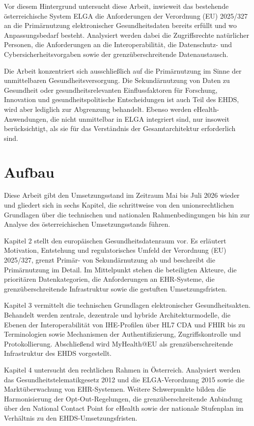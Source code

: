 Vor diesem Hintergrund untersucht diese Arbeit, inwieweit das bestehende österreichische System ELGA die Anforderungen der Verordnung (EU) 2025/327 an die Primärnutzung elektronischer Gesundheitsdaten bereits erfüllt und wo Anpassungsbedarf besteht. Analysiert werden dabei die Zugriffsrechte natürlicher Personen, die Anforderungen an die Interoperabilität, die Datenschutz- und Cybersicherheitsvorgaben sowie der grenzüberschreitende Datenaustausch.

Die Arbeit konzentriert sich ausschließlich auf die Primärnutzung im Sinne der unmittelbaren Gesundheitsversorgung. Die Sekundärnutzung von Daten zu Gesundheit oder gesundheitsrelevanten Einflussfaktoren für Forschung, Innovation und gesundheitspolitische Entscheidungen ist auch Teil des EHDS, wird aber lediglich zur Abgrenzung behandelt. Ebenso werden eHealth-Anwendungen, die nicht unmittelbar in ELGA integriert sind, nur insoweit berücksichtigt, als sie für das Verständnis der Gesamtarchitektur erforderlich sind.

\section{Aufbau}
Diese Arbeit gibt den Umsetzungsstand im Zeitraum Mai bis Juli 2026 wieder und gliedert sich in sechs Kapitel, die schrittweise von den unionsrechtlichen Grundlagen über die technischen und nationalen Rahmenbedingungen bis hin zur Analyse des österreichischen Umsetzungsstands führen.

Kapitel 2 stellt den europäischen Gesundheitsdatenraum vor. Es erläutert Motivation, Entstehung und regulatorisches Umfeld der Verordnung (EU) 2025/327, grenzt Primär- von Sekundärnutzung ab und beschreibt die Primärnutzung im Detail. Im Mittelpunkt stehen die beteiligten Akteure, die prioritären Datenkategorien, die Anforderungen an EHR-Systeme, die grenzüberschreitende Infrastruktur sowie die gestuften Umsetzungsfristen.

Kapitel 3 vermittelt die technischen Grundlagen elektronischer Gesundheitsakten. Behandelt werden zentrale, dezentrale und hybride Architekturmodelle, die Ebenen der Interoperabilität von IHE-Profilen über HL7 CDA und FHIR bis zu Terminologien sowie Mechanismen der Authentifizierung, Zugriffskontrolle und Protokollierung. Abschließend wird MyHealth@EU als grenzüberschreitende Infrastruktur des EHDS vorgestellt.

Kapitel 4 untersucht den rechtlichen Rahmen in Österreich. Analysiert werden das Gesundheitstelematikgesetz 2012 und die ELGA-Verordnung 2015 sowie die Marktüberwachung von EHR-Systemen. Weitere Schwerpunkte bilden die Harmonisierung der Opt-Out-Regelungen, die grenzüberschreitende Anbindung über den National Contact Point for eHealth sowie der nationale Stufenplan im Verhältnis zu den EHDS-Umsetzungsfristen.

